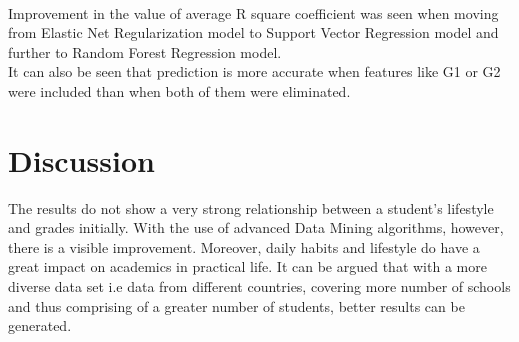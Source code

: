 \documentclass[conference]{IEEEtran}
\begin{document}
\\Improvement in the value of average R square coefficient was seen when moving from Elastic Net Regularization model to Support Vector Regression model and further to Random Forest Regression model.
\\It can also be seen that prediction is more accurate when features like G1 or G2 were included than when both of them were eliminated.
\section*{Discussion}
The results do not show a very strong relationship between a student's lifestyle and grades initially. With the use of advanced Data Mining algorithms, however, there is a visible improvement. Moreover, daily habits and lifestyle do have a great impact on academics in practical life. It can be argued that with a more diverse data set i.e data from different countries, covering more number of schools and thus comprising of a greater number of students, better results can be generated.



 

\end{document}
